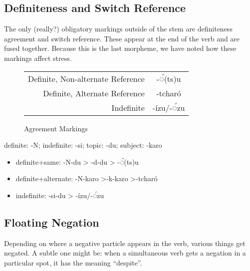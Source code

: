 \documentclass[12pt]{book} %
\begin{document}
\subsection{Definiteness and Switch Reference}

The {\color{red}only (really?)} obligatory markings outside of the stem are definiteness agreement and switch reference.
These appear at the end of the verb and are fused together.
Because this is the last morpheme, we have noted how these markings affect stress.

\begin{figure}[H]
\centering
	\begin{tabular}{rc}
		Definite, Non-alternate Reference	& -◌́(ts)u		\\
		Definite, Alternate Reference		& -tcharó		\\
		Indefinite						& -ízu/-◌́zu	\\
	\end{tabular}
\caption{Agreement Markings}\label{t:agreement}
\end{figure}


{\color{green}
definite: -N; indefinite: -si;
topic: -du; subject: -karo
\begin{itemize}
\item definite+same: -N-du > -d-du > -◌́(ts)u
\item definite+alternate: -N-karo >-k-karo >-tcharó
\item indefinite: -si-du > -ízu/-◌́zu\
\end{itemize}
}




\subsection{Floating Negation}
{\color{orange}
Depending on where a negative particle appears in the verb, various things get negated.
A subtle one might be: when a simultaneous verb gets a negation in a particular spot, it has the meaning ``despite''.
}

 
\end{document}
